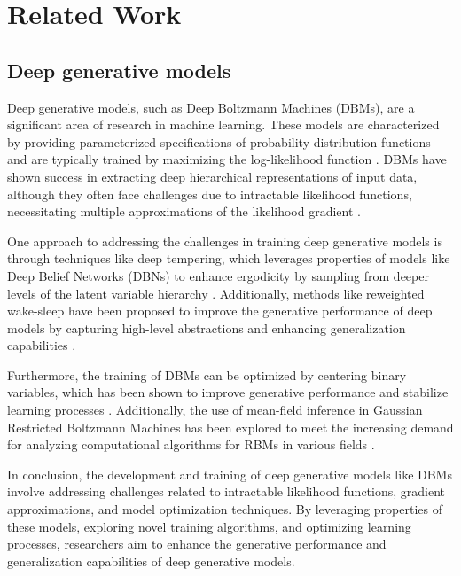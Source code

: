 \chapter{Related Work}
\label{Related Work}

\section*{Deep generative models}


Deep generative models, such as Deep Boltzmann Machines (DBMs), are a significant area of research in machine learning. These models are characterized by providing parameterized specifications of probability distribution functions and are typically trained by maximizing the log-likelihood function \citep{10.48550/arxiv.1603.06170}. DBMs have shown success in extracting deep hierarchical representations of input data, although they often face challenges due to intractable likelihood functions, necessitating multiple approximations of the likelihood gradient \citep{10.1109/access.2014.2319813}.

One approach to addressing the challenges in training deep generative models is through techniques like deep tempering, which leverages properties of models like Deep Belief Networks (DBNs) to enhance ergodicity by sampling from deeper levels of the latent variable hierarchy \citep{10.48550/arxiv.1410.0123}. Additionally, methods like reweighted wake-sleep have been proposed to improve the generative performance of deep models by capturing high-level abstractions and enhancing generalization capabilities \citep{10.48550/arxiv.1406.2751}.

Furthermore, the training of DBMs can be optimized by centering binary variables, which has been shown to improve generative performance and stabilize learning processes \citep{10.48550/arxiv.1311.1354}. Additionally, the use of mean-field inference in Gaussian Restricted Boltzmann Machines has been explored to meet the increasing demand for analyzing computational algorithms for RBMs in various fields \citep{10.7566/jpsj.85.034001}.

In conclusion, the development and training of deep generative models like DBMs involve addressing challenges related to intractable likelihood functions, gradient approximations, and model optimization techniques. By leveraging properties of these models, exploring novel training algorithms, and optimizing learning processes, researchers aim to enhance the generative performance and generalization capabilities of deep generative models.




